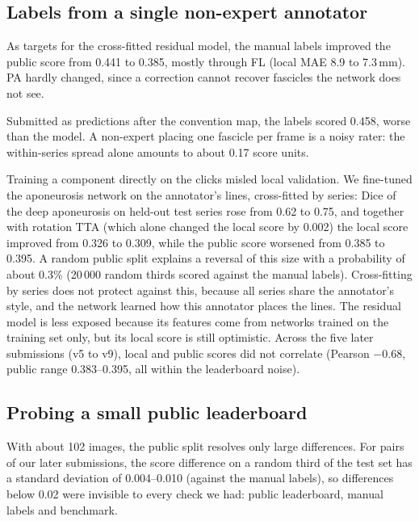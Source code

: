 \documentclass[11pt,a4paper]{article}
\begin{document}
\subsection{Labels from a single non-expert annotator}
\label{sec:leak}

As targets for the cross-fitted residual model, the manual labels improved the public score from 0.441 to 0.385, mostly through FL (local MAE 8.9 to 7.3\,mm). PA hardly changed, since a correction cannot recover fascicles the network does not see.

Submitted as predictions after the convention map, the labels scored 0.458, worse than the model. A non-expert placing one fascicle per frame is a noisy rater: the within-series spread alone amounts to about 0.17 score units.

Training a component directly on the clicks misled local validation. We fine-tuned the aponeurosis network on the annotator's lines, cross-fitted by series: Dice of the deep aponeurosis on held-out test series rose from 0.62 to 0.75, and together with rotation TTA (which alone changed the local score by 0.002) the local score improved from 0.326 to 0.309, while the public score worsened from 0.385 to 0.395. A random public split explains a reversal of this size with a probability of about 0.3\% (20\,000 random thirds scored against the manual labels). Cross-fitting by series does not protect against this, because all series share the annotator's style, and the network learned how this annotator places the lines. The residual model is less exposed because its features come from networks trained on the training set only, but its local score is still optimistic. Across the five later submissions (v5 to v9), local and public scores did not correlate (Pearson $-0.68$, public range 0.383--0.395, all within the leaderboard noise).

\subsection{Probing a small public leaderboard}
\label{sec:probing}

With about 102 images, the public split resolves only large differences. For pairs of our later submissions, the score difference on a random third of the test set has a standard deviation of 0.004--0.010 (against the manual labels), so differences below 0.02 were invisible to every check we had: public leaderboard, manual labels and benchmark.
\end{document}
